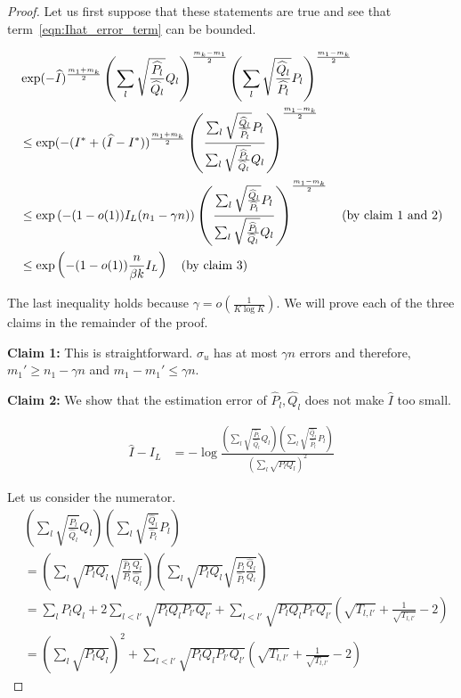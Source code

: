 \begin{proof}
Let us first suppose that these statements are true and see that term~\ref{eqn:Ihat_error_term} can be bounded. 


\begin{align*}
& \exp( - \widehat{I} )^{\frac{m_1 + m_k}{2}}  \left( \sum_l \sqrt{\frac{\widehat{P}_l}{\widehat{Q}_l}} Q_l \right)^{\frac{m_k - m_1}{2}} 
 \left( \sum_l \sqrt{\frac{\widehat{Q}_l}{\widehat{P}_l}} P_l \right)^{\frac{m_1 - m_k}{2}}  \\
&\leq  \exp( - (I^* + (\widehat{I} - I^*) )^{\frac{m_1 + m_k}{2}}  
 \left( \frac{\sum_l \sqrt{\frac{\widehat{Q}_l}{\widehat{P}_l}} P_l}
             {\sum_l \sqrt{\frac{\widehat{P}_l}{\widehat{Q}_l}} Q_l} \right)^{\frac{m_1 - m_k}{2}}  
  \\
&\leq \exp \left( - (1-o(1)) I_L (n_1 - \gamma n) \right) 
   \left( \frac{\sum_l \sqrt{\frac{\widehat{Q}_l}{\widehat{P}_l}} P_l}
             {\sum_l \sqrt{\frac{\widehat{P}_l}{\widehat{Q}_l}} Q_l} \right)^{\frac{m_1 - m_k}{2}}  
   \quad \textrm{(by claim 1 and 2)}\\
&\leq \exp \left( - (1-o(1)) \frac{n}{\beta k} I_L  \right) 
   \quad \textrm{(by claim 3)}
\end{align*}

The last inequality holds because $\gamma = o\left( \frac{1}{K \log K} \right)$. We will prove each of the three claims in the remainder of the proof.

\textbf{Claim 1:} This is straightforward. $\sigma_u$ has at most $\gamma n$ errors and therefore, $m_1' \geq n_1 - \gamma n$ and $m_1 - m_1' \leq \gamma n$. 

\textbf{Claim 2:} We show that the estimation error of $\hat{P}_l, \hat{Q}_l$ does not make $\hat{I}$ too small.

\begin{align}
\hat{I} - I_L &= - \log \frac{ 
     \left( \sum_l \sqrt{\frac{\hat{P}_l}{\hat{Q}_l}} Q_l \right)
     \left( \sum_l \sqrt{\frac{\hat{Q}_l}{\hat{P}_l}} P_l \right)}{ 
          \left( \sum_l \sqrt{P_l Q_l} \right)^2 } \label{eqn:Ihat_Istar}
\end{align}

Let us consider the numerator.
\begin{align*}
& \left( \sum_l \sqrt{ \frac{\hat{P}_l}{\hat{Q}_l}} Q_l \right)
\left( \sum_l \sqrt{ \frac{\hat{Q}_l}{\hat{P}_l}} P_l \right) \\
&= \left( \sum_l \sqrt{ P_l Q_l} \sqrt{ \frac{\hat{P}_l}{P_l} \frac{Q_l}{\hat{Q}_l}} \right) 
     \left( \sum_l \sqrt{P_l Q_l} \sqrt{ \frac{P_l}{\hat{P}_l} \frac{\hat{Q}_l}{ Q_l}} \right) \\
&= \sum_l P_l Q_l + 2\sum_{l < l'} \sqrt{P_l Q_l P_{l'} Q_{l'}} + 
   \sum_{l < l'} \sqrt{P_l Q_l P_{l'} Q_{l'}} \left( \sqrt{T_{l,l'}} + \frac{1}{\sqrt{T_{l,l'}}} - 2 \right) \\
&= \left( \sum_l \sqrt{P_l Q_l} \right)^2 + \sum_{l < l'} 
                  \sqrt{P_l Q_l P_{l'} Q_{l'}} \left( \sqrt{T_{l,l'}} + \frac{1}{\sqrt{T_{l,l'}}} - 2 \right) 
\end{align*}


\end{proof}
